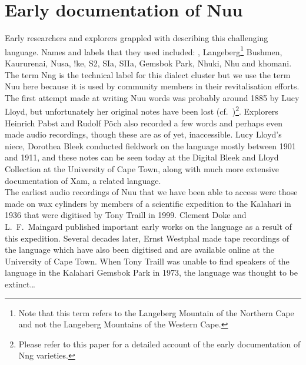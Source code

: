 \markboth{}{}
\addtocounter{section}{-1}
\tocless\section{Early documentation of N\textipa{\textvertline}uu}
{}
\markboth{}{}

Early researchers and explorers grappled with describing this
challenging language. Names and labels that they used included:
\textipa{\textdoublevertline}, Langeberg\footnote{Note that
this term refers to the Langeberg Mountain of the Northern Cape and not
the Langeberg Mountains of the Western Cape.} Bushmen,
\textipa{\textdoublebarpipe}Kaurure\textipa{\textdoublevertline}nai,
N\textipa{\textvertline}usa, \textipa{\textdoublevertline}
!ke, S2, SIa, SIIa, Gemsbok Park, N\textipa{\textvertline}huki,
N\textipa{\textvertline}hu and \textipa{\textdoublebarpipe}khomani.
The term N\textipa{\textdoublevertline}ng is the technical label for
this dialect cluster but we use the term N\textipa{\textvertline}uu
here because it is used by community members in their revitalisation
efforts.  The first attempt made at writing N\textipa{\textvertline}uu
words was probably around 1885 by Lucy Lloyd, but unfortunately her
original notes have been lost (cf.\
\cite{Gueldemann2017})\footnote{Please refer to this paper for a
detailed account of the early documentation of
N\textipa{\textdoublevertline}ng varieties.}. Explorers Heinrich Pabst
and Rudolf P\"{o}ch also recorded a few words and perhaps even made
audio recordings, though these are as of yet, inaccessible. Lucy
Lloyd's niece, Dorothea Bleek conducted fieldwork on the language
mostly between 1901 and 1911, and these notes can be seen today at the
Digital Bleek and Lloyd Collection at the University of Cape Town,
along with much more extensive documentation of
\textipa{\textvertline}Xam, a related language.\\

The earliest audio recordings of N\textipa{\textvertline}uu that we
have been able to access were those made on wax cylinders by members
of a scientific expedition to the Kalahari in 1936 that were digitised
by Tony Traill in 1999. Clement Doke and L.\ F.\ Maingard published
important early works on the language as a result of this expedition.
Several decades later, Ernst Westphal made tape recordings of the
language which have also been digitised and are available online at
the University of Cape Town. When Tony Traill was unable to find
speakers of the language in the Kalahari Gemsbok Park in 1973, the
language was thought to be extinct\ldots
\vspace{.5cm}

